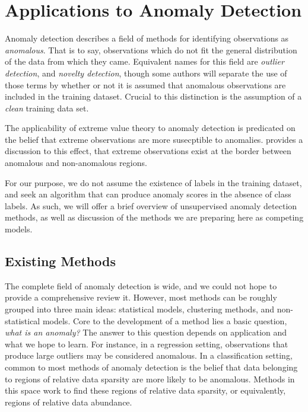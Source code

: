 \section{Applications to Anomaly Detection}
\label{sec:anomaly}
Anomaly detection describes a field of methods for identifying observations as \emph{anomalous}.  That
  is to say, observations which do not fit the general distribution of the data from which they came.
  Equivalent names for this field are \emph{outlier detection}, and \emph{novelty detection}, though
  some authors will separate the use of those terms by whether or not it is assumed that anomalous
  observations are included in the training dataset.  Crucial to this distinction is the assumption
  of a \emph{clean} training data set.

The applicability of extreme value theory to anomaly detection is predicated on the belief that
  extreme observations are more susecptible to anomalies.  \cite{goix2017} provides a discussion to
  this effect, that extreme observations exist at the border between anomalous and non-anomalous regions.

For our purpose, we do not assume the existence of labels in the training dataset, and seek an
  algorithm that can produce anomaly scores in the absence of class labels. As such, we will offer
  a brief overview of unsupervised anomaly detection methods, as well as discussion of the methods
  we are preparing here as competing models.

\subsection{Existing Methods}
The complete field of anomaly detection is wide, and we could not hope to provide a comprehensive review
  it.  However, most methods can be roughly grouped into three main ideas: statistical models, clustering
  methods, and non-statistical models. Core to the development of a method lies a basic question,
  \emph{what is an anomaly?}  The answer to this question depends on application and what we hope to
  learn.  For instance, in a regression setting, observations that produce large outliers may be considered
  anomalous.  In a classification setting, common to most methods of anomaly detection is the belief
  that data belonging to regions of relative data sparsity are more likely to be anomalous.  Methods in
  this space work to find these regions of relative data sparsity, or equivalently, regions of relative
  data abundance.

